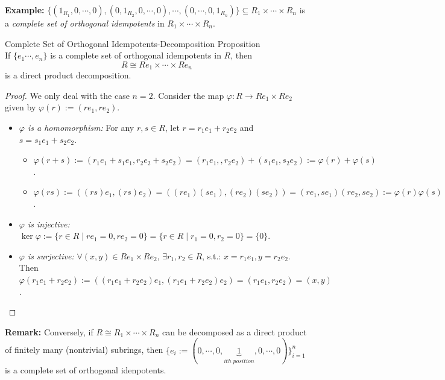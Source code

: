 \noindent\textbf{Example:} $\{(1_{R_1}, 0,\cdots, 0) , (0,1_{R_2},0,\cdots, 0) ,\cdots, (0,\cdots, 0,1_{R_n}) \} \subseteq R_1 \times \cdots \times R_n$ is a \textit{complete set of orthogonal idempotents} in $R_1 \times \cdots \times R_n$.

\begin{proposition}{Complete Set of Orthogonal Idempotents-Decomposition Proposition}\\
If $\{e_1 \cdots, e_n \}$ is a complete set of orthogonal idempotents in $R$, then
$$R \cong R e_1 \times \cdots \times Re_n$$
is a direct product decomposition.
\end{proposition}

\begin{proof}
    We only deal with the case $n=2$. Consider the map $\varphi: R \to R e_1 \times Re_2$ given by $\varphi(r):= (re_1,re_2)$.
    \begin{itemize}
        \item \textit{$\varphi$ is a homomorphism:} For any $r,s \in R$, let $r=r_1e_1 +r_2e_2$ and $s=s_1e_1+ s_2e_2$.
        \begin{itemize}
            \item $\varphi(r+s) := (r_1e_1+s_1e_1 ,r_2e_2 + s_2e_2) = (r_1e_1,,r_2e_2) +(s_1e_1, s_2e_2) := \varphi(r)+\varphi(s)$.
            \item $\varphi (rs) := ((rs)e_1,(rs)e_2) = ((re_1)(se_1) ,(re_2)(se_2)) = (re_1,se_1) (re_2,se_2) := \varphi(r)\varphi(s)$.
        \end{itemize}

        \item \textit{$\varphi$ is injective:} $\ker \varphi :=\{ r\in R \mid re_1=0,re_2=0 \} =\{r\in R\mid r_1=0,r_2=0\}= \{0\}$.
        \item \textit{$\varphi$ is surjective:} $\forall (x,y) \in Re_1 \times Re_2$, $\exists r_1,r_2 \in R$, s.t.: $x=r_1e_1,y=r_2e_2$. Then $\varphi(r_1e_1+r_2e_2) := ((r_1e_1+r_2e_2)e_1,(r_1e_1+r_2e_2)e_2) = (r_1e_1,r_2e_2) = (x,y)$.
    \end{itemize}
\end{proof}

\noindent\textbf{Remark:} Conversely, if $R \cong R_1 \times \cdots \times R_n$ can be decomposed as a direct product of finitely many (nontrivial) subrings, then $\{ e_i:= (0,\cdots,0,\underbrace{1}_{ith\; position},0,\cdots,0)\}_{i=1}^n$ is a complete set of orthogonal idenpotents.

